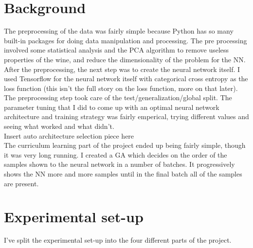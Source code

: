 \documentclass[conference]{IEEEtran}
\begin{document}
\section{Background}
The preprocessing of the data was fairly simple because Python has so many built-in
packages for doing data manipulation and processing. The pre processing involved some
statistical analysis and the PCA algorithm to remove useless properties of the wine, 
and reduce the dimensionality of the problem for the NN.
\\
After the preprocessing, the next step was to create the neural network itself.
I used Tensorflow for the neural network itself with categorical cross entropy
as the loss function (this isn't the full story on the loss function, more on that later).
The preprocessing step took care of the test/generalization/global split. The 
parameter tuning that I did to come up with an optimal neural network architecture
and training strategy was fairly emperical, trying different values and seeing
what worked and what didn't.
\\
Insert auto architecture selection piece here
\\
The curriculum learning part of the project ended up being fairly simple, though
it was very long running. I created a GA which decides on the order
of the samples shown to the neural network in a number of batches.
It progressively shows the NN more and more samples until in the final batch
all of the samples are present.


\section{Experimental set-up}
I've split the experimental set-up into the four different parts of the project.
\end{document}
